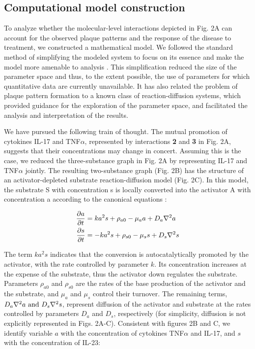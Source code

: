 \subsection{Computational model construction}
To analyze whether the molecular-level interactions depicted in Fig. 2A can account for the observed plaque patterns and the response of the disease to treatment, we constructed a mathematical model. We followed the standard method of simplifying the modeled system to focus on its essence and make the model more amenable to analysis \citep{bak1996, gaines1977, prusinkiewicz1998}. This simplification reduced the size of the parameter space and thus, to the extent possible, the use of parameters for which quantitative data are currently unavailable. It has also related the problem of plaque pattern formation to a known class of reaction-diffusion systems, which provided guidance for the exploration of the parameter space, and facilitated the analysis and interpretation of the results.
 
We have pursued the following train of thought. The mutual promotion of cytokines IL-17 and TNF$\alpha$, represented by interactions \textbf{2} and \textbf{3} in Fig. 2A, suggests that their concentrations may change in concert. Assuming this is the case, we reduced the three-substance graph in Fig. 2A by representing IL-17 and TNF$\alpha$ jointly. The resulting two-substance graph (Fig. 2B) has the structure of an activator-depleted substrate reaction-diffusion model \citep{gierer1972, marcon2016}(Fig. 2C). In this model, the substrate S with concentration s is locally converted into the activator A with concentration a according to the canonical equations \citep{gierer1972, meinhardt1982}:

\begin{equation}
	\begin{aligned} \label{eq:ahPsoriasis}
	\frac{\partial a}{\partial t} &= ka^2s+\rho_{a0}-\mu_a a + D_a \nabla^2 a \\
	\frac{\partial s}{\partial t} &= -ka^2s+\rho_{s0}-\mu_s s + D_s \nabla^2 s
	\end{aligned}
\end{equation}

The term $ka^2s$ indicates that the conversion is autocatalytically promoted by the activator, with the rate controlled by parameter $k$. Its concentration increases at the expense of the substrate, thus the activator down regulates the substrate. Parameters $\rho_{a0}$ and $\rho_{s0}$ are the rates of the base production of the activator and the substrate, and $\mu_a$ and $\mu_s$ control their turnover. The remaining terms, $D_a \nabla^2 a \text{ and } D_s \nabla^2 s$, represent diffusion of the activator and substrate at the rates controlled by parameters $D_a$ and $D_s$, respectively (for simplicity, diffusion is not explicitly represented in Figs. 2A-C). Consistent with figures 2B and C, we identify variable $a$ with the concentration of cytokines TNF$\alpha$ and IL-17, and $s$ with the concentration of IL-23:

